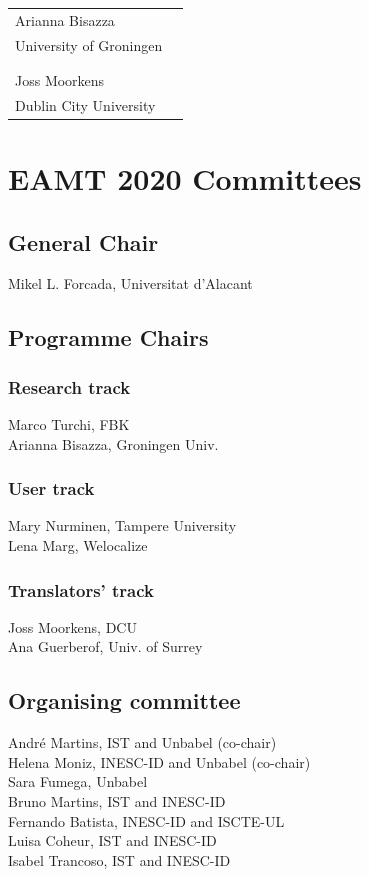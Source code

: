 \documentclass[a4paper,11pt,twoside]{book}
\begin{document}
\vspace{1cm}
\begin{center}
\begin{tabular}{ll}
Arianna Bisazza\\
University of Groningen\\
\\
\\
Joss Moorkens\\
Dublin City University\\
\end{tabular}

\end{center}


\chapter*{EAMT 2020 Committees}

\section*{General Chair}
\noindent Mikel L. Forcada, Universitat d’Alacant


\section*{Programme Chairs}
\subsection*{Research track}
\noindent Marco Turchi, FBK\\
\noindent Arianna Bisazza, Groningen Univ.

\subsection*{User track}
\noindent Mary Nurminen, Tampere University\\
\noindent Lena Marg, Welocalize

\subsection*{Translators' track}
\noindent Joss Moorkens, DCU\\
\noindent Ana Guerberof, Univ. of Surrey

\section*{Organising committee}
\noindent André Martins, IST and Unbabel (co-chair)\\
\noindent Helena Moniz, INESC-ID and Unbabel (co-chair)\\
\noindent Sara Fumega, Unbabel\\
\noindent Bruno Martins, IST and INESC-ID\\
\noindent Fernando Batista, INESC-ID and ISCTE-UL\\
\noindent Luisa Coheur, IST and INESC-ID\\
\noindent Isabel Trancoso, IST and INESC-ID
\end{document}
